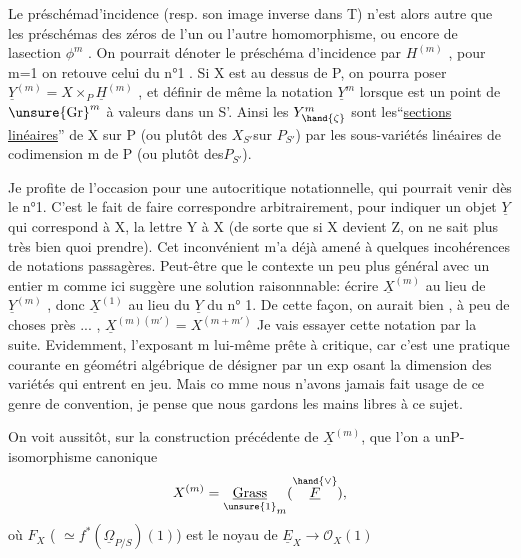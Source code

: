 
Le préschémad'incidence  (resp. son image inverse dans T) n'est alors
autre que les préschémas des zéros de l'un ou l'autre homomorphisme,
ou encore de lasection $\phi^{m}$ .  On pourrait dénoter le préschéma
d'incidence par $H^{(m)}$ , pour m=1 on retouve celui du n°1 .  Si X est
au dessus de P, on pourra poser $\underline{Y}^{(m)} = X\times_{P} \underline{H}^{(m)}$ ,  et définir de même
la notation $\underline{Y}^{m}$ lorsque \hand{$\zeta$} est un point de $\unsure{\mathrm{Gr}}^{m}$ à valeurs dans un S'.
Ainsi les  $Y^{m}_{\hand{\zeta}}$  sont les``\uline{sections} \uline{linéaires}''  de X sur P (ou plutôt des
$X_{S'}$sur $P_{S'}$)   par les sous-variétés linéaires de codimension m de P (ou
plutôt des$P_{S'}$).

\placedmargin{$|$}Je profite de l'occasion pour une  autocritique notationnelle,
qui pourrait venir dès le n°1. C'est le fait  de faire correspondre
arbitrairement, pour indiquer un objet $\underline{Y}$ qui correspond à X, la lettre
Y à X  (de sorte que si X devient Z, on ne sait plus très bien quoi
prendre). Cet inconvénient m'a déjà amené à quelques incohérences de
notations passagères.  Peut-être que le contexte un peu plus général
avec un entier m comme ici suggère une solution raisonnnable: écrire
$\underline{X}^{(m)}$ au lieu de  $\underline{Y}^{(m)}$ , donc  $\underline{X}^{(1)}$ au lieu du  $\underline{Y}$  du n° 1. De cette
façon, on  aurait bien , à peu de choses près ... ,  $\underline{X}^{(m)(m')} = X^{(m+m')}$
Je vais essayer cette notation par la suite.  Evidemment, l'exposant m
lui-même prête à critique, car  c'est une pratique courante en géométri
algébrique de désigner par un exp osant la dimension des variétés qui
entrent en jeu. Mais co mme nous n'avons jamais fait usage de ce genre
de convention, je pense que nous gardons les mains libres à ce sujet.

On voit aussitôt, sur la construction précédente de $\underline{X}^{(m)}$, que
l'on a unP-isomorphisme canonique
\[ X^{(m)} = \underset{\unsure{1}}{\underline{\mathrm{Grass}}}_{m}(\overset{\hand{\vee}}{\underline{F}}) , \]
où  $F_{X}$  ( $\simeq f^{*}(\underline{\Omega}_{P/S})(1)$)   est le noyau de  $\underline{E}_{X} \longrightarrow \mathcal{O}_{X}(1)$\hand{,}


